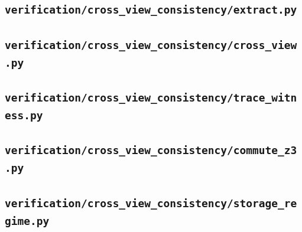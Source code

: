 \documentclass[11pt]{article}
\theoremstyle{definition}
\begin{document}
\subsection{\texttt{verification/cross\_view\_consistency/extract.py}}

\subsection{\texttt{verification/cross\_view\_consistency/cross\_view.py}}

\subsection{\texttt{verification/cross\_view\_consistency/trace\_witness.py}}

\subsection{\texttt{verification/cross\_view\_consistency/commute\_z3.py}}

\subsection{\texttt{verification/cross\_view\_consistency/storage\_regime.py}}

\end{document}
